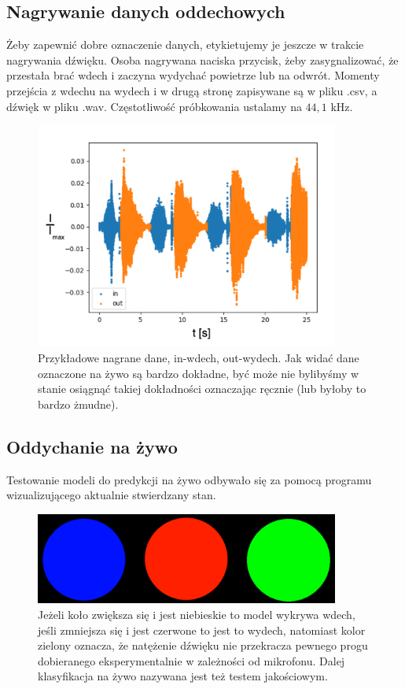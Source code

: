 \documentclass[polish]{article}
\begin{document}
\subsection{Nagrywanie danych oddechowych}
Żeby zapewnić dobre oznaczenie danych, etykietujemy je jeszcze w trakcie nagrywania dźwięku. 
Osoba nagrywana naciska przycisk, żeby zasygnalizować, że przestała brać wdech i zaczyna wydychać 
powietrze lub na odwrót. Momenty przejścia z wdechu na wydech i w drugą stronę zapisywane są w pliku
.csv, a dźwięk w pliku .wav. Częstotliwość próbkowania ustalamy na $44,1$ kHz.
\begin{figure}[H]
	\centering
	\includegraphics[width=10cm]{nagrywanie_ozn}
	\caption{Przykładowe nagrane dane, in-wdech, out-wydech. Jak widać dane oznaczone na żywo są bardzo dokładne, być może nie bylibyśmy w stanie osiągnąć takiej
dokładności oznaczając ręcznie (lub byłoby to bardzo żmudne).}
\end{figure}
\subsection{Oddychanie na żywo}
Testowanie modeli do predykcji na żywo odbywało się za pomocą programu wizualizującego aktualnie
stwierdzany stan. 
\begin{figure}[H]
	\centering
	\includegraphics[width=10cm]{wdechwydechcisza}
	\caption{Jeżeli koło zwiększa się i jest niebieskie to model wykrywa wdech, jeśli zmniejsza się i jest
czerwone to jest to wydech, natomiast kolor zielony oznacza, że natężenie dźwięku nie przekracza pewnego 
progu dobieranego eksperymentalnie w zależności od mikrofonu.
Dalej klasyfikacja na żywo nazywana jest też testem jakościowym.}
\end{figure}
\end{document}
